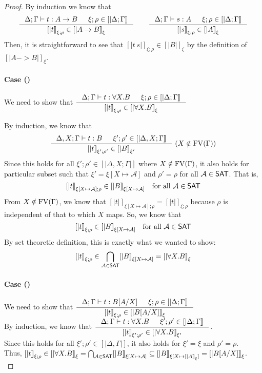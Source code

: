 \begin{proof}
By induction we know that
\[
\inference{\Delta;\Gamma |- t : A -> B & \xi;\rho\in[|\Delta;\Gamma|]}{[|t|]_{\xi;\rho} \in [|A -> B|]_\xi}
\qquad
\inference{\Delta;\Gamma |- s : A & \xi;\rho\in[|\Delta;\Gamma|]}{[|s|]_{\xi;\rho} \in [|A|]_\xi}
\]
Then, it is straightforward to see that $[|t~s|]_{\xi;\rho}\in[|B|]_\xi$
by the definition of $[|A -> B|]_\xi$.

\paragraph{Case ()}
We need to show that
$ \inference{\Delta;\Gamma |- t : \forall X.B & \xi;\rho\in[|\Delta;\Gamma|]}
        {[|t|]_{\xi;\rho} \in [|\forall X.B|]_\xi} $

By induction, we know that
\[ \inference{\Delta,X;\Gamma |- t : B & \xi';\rho'\in[|\Delta,X;\Gamma|]}
        {[|t|]_{\xi';\rho'} \in [|B|]_{\xi'}} ~
        (X\notin\FV(\Gamma))
\]
Since this holds for all $\xi';\rho' \in [|\Delta,X;\Gamma|]$ where
$X\notin\mathop{\mathrm{FV}}(\Gamma)$, it also holds for particular subset such that
$\xi' = \xi[X\mapsto\mathcal{A}]$ and $\rho'=\rho$ for all $\mathcal{A}\in\mathsf{SAT}$.
That is,
\[ [|t|]_{\xi[X\mapsto\mathcal{A}];\rho} \in [|B|]_{\xi[X\mapsto\mathcal{A}]}
   \quad \text{for all}~\mathcal{A}\in\mathsf{SAT} \]
From $X\notin\mathop{\mathrm{FV}}(\Gamma)$, we know that
$[|t|]_{\xi[X\mapsto\mathcal{A}];\rho} = [|t|]_{\xi;\rho}$
because $\rho$ is independent of that to which $X$ maps.
So, we know that
\[ [|t|]_{\xi;\rho} \in [|B|]_{\xi[X\mapsto\mathcal{A}]}
        \quad \text{for all}~\mathcal{A}\in\mathsf{SAT} \]
By set theoretic definition, this is exactly what we wanted to show:
\[ [|t|]_{\xi;\rho} \in
        \bigcap_{\mathcal{A}\in\mathsf{SAT}} [|B|]_{\xi[X\mapsto\mathcal{A}]}
        = [|\forall X.B|]_\xi
\]

\paragraph{Case ()}
We need to show that
$ \inference{\Delta;\Gamma |- t : B[A/X] & \xi;\rho\in[|\Delta;\Gamma|]}
        {[|t|]_{\xi;\rho} \in [|B[A/X]|]_\xi} $
\vspace{.3em}\\
By induction, we know that
$ \inference{\Delta;\Gamma |- t : \forall X.B & \xi';\rho'\in[|\Delta;\Gamma|]}
        {[|t|]_{\xi';\rho'} \in [|\forall X.B|]_{\xi'}} $.
\vspace{.3em}\\
Since this holds for all $\xi';\rho' \in [|\Delta,\Gamma|]$,
it also holds for $\xi'=\xi$ and $\rho'=\rho$.
\vspace{.3em}\\
Thus,
$ [|t|]_{\xi;\rho} \in [|\forall X.B|]_{\xi}
        = \bigcap_{\mathcal{A}\in\mathsf{SAT}} [|B|]_{\xi[X\mapsto\mathcal{A}]}
	\subseteq [|B|]_{\xi[X\mapsto[|A|]_\xi]} = [|B[A/X]|]_\xi $.\\
\end{proof}


